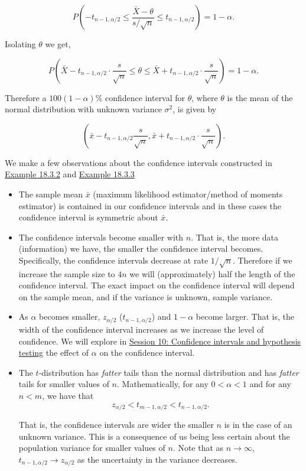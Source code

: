 \documentclass[
]{book}
\providecommand{\tightlist}{%
  \setlength{\itemsep}{0pt}\setlength{\parskip}{0pt}}
\begin{document}
\[ P \left( -t_{n-1,\alpha/2} \leq \frac{\bar{X}-\theta}{s/\sqrt{n}} \leq t_{n-1,\alpha/2} \right) = 1-\alpha.\]

Isolating \(\theta\) we get,

\[ P \left( \bar{X} -t_{n-1,\alpha/2} \cdot \frac{s}{\sqrt{n}} \leq \theta \leq \bar{X} +t_{n-1,\alpha/2} \cdot \frac{s}{\sqrt{n}} \right) = 1-\alpha.\]

Therefore a \(100(1-\alpha)\%\) confidence interval for \(\theta\), where \(\theta\) is the mean of the normal distribution with unknown variance \(\sigma^2\), is given by

\[\left( \bar{x} - t_{n-1,\alpha/2} \frac{s}{\sqrt{n}}, \bar{x} + t_{n-1,\alpha/2} \cdot \frac{s}{\sqrt{n}} \right). \]

We make a few observations about the confidence intervals constructed in \protect\hyperlink{Interval_Estimation:ex:CI_normal_known}{Example 18.3.2} and \protect\hyperlink{Interval_Estimation:ex:CI_normal_unknown}{Example 18.3.3}

\begin{itemize}
\tightlist
\item
  The sample mean \(\bar{x}\) (maximum likelihood estimator/method of moments estimator) is contained in our confidence intervals and in these cases the confidence interval is symmetric about \(\bar{x}\).\\
\item
  The confidence intervals become smaller with \(n\). That is, the more data (information) we have, the smaller the confidence interval becomes. Specifically, the confidence intervals decrease at rate \(1/\sqrt{n}\). Therefore if we increase the sample size to \(4 n\) we will (approximately) half the length of the confidence interval. The exact impact on the confidence interval will depend on the sample mean, and if the variance is unknown, sample variance.\\
\item
  As \(\alpha\) becomes smaller, \(z_{\alpha/2}\) (\(t_{n-1,\alpha/2}\)) and \(1- \alpha\) become larger. That is, the width of the confidence interval increases as we increase the level of confidence. We will explore in \protect\hyperlink{Sec_Hypo_Test:lab}{Session 10: Confidence intervals and hypothesis testing} the effect of \(\alpha\) on the confidence interval.\\
\item
  The \(t\)-distribution has \emph{fatter} tails than the normal distribution and has \emph{fatter} tails for smaller values of \(n\). Mathematically, for any \(0 < \alpha <1\) and for any \(n < m\), we have that\\

  \[ z_{\alpha/2} < t_{m-1,\alpha/2} < t_{n-1,\alpha/2}. \]

  That is, the confidence intervals are wider the smaller \(n\) is in the case of an unknown variance. This is a consequence of us being less certain about the population variance for smaller values of \(n\). Note that as \(n \to \infty\), \(t_{n-1,\alpha/2} \to z_{\alpha/2}\) as the uncertainty in the variance decreases.
\end{itemize}
\end{document}

